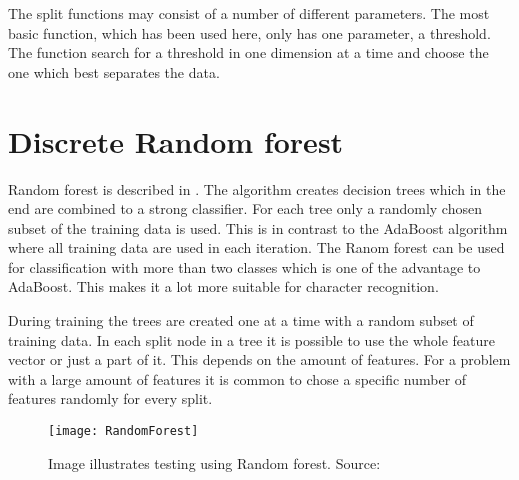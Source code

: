 The split functions may consist of a number of different parameters. The most basic function, which has been used here, only has one parameter, a threshold. The function search for a threshold in one dimension at a time and choose the one which best separates the data.

\section{Discrete Random forest}
\label{sec:Discret Random forest}
Random forest is described in \citep{Criministi:2011}. The algorithm creates decision trees which in the end are combined to a strong classifier. For each tree only a randomly chosen subset of the training data is used. This is in contrast to the AdaBoost algorithm where all training data are used in each iteration. The Ranom forest can be used for classification with more than two classes which is one of the advantage to AdaBoost. This makes it a lot more suitable for character recognition.

During training the trees are created one at a time with a random subset of training data. In each split node in a tree it is possible to use the whole feature vector or just a part of it. This depends on the amount of features. For a problem with a large amount of features it is common to chose a specific number of features randomly for every split.  

\begin{figure}[H]
\centering
	\texttt{[image: RandomForest]}
	\caption{Image illustrates testing using Random forest. Source: \citep{Criministri:2011}}
	\label{FAST}
\end{figure}
 
